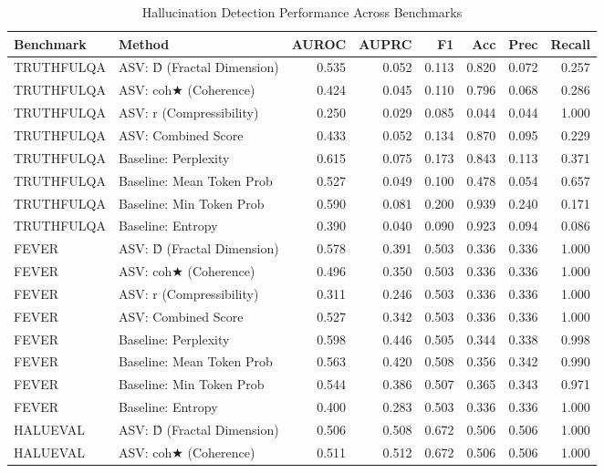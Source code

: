 \begin{table}[htbp]
\centering
\caption{Hallucination Detection Performance Across Benchmarks}
\label{tab:results}
\begin{tabular}{llrrrrrr}
\toprule
Benchmark & Method & AUROC & AUPRC & F1 & Acc & Prec & Recall \\
\midrule
TRUTHFULQA & ASV: D̂ (Fractal Dimension) & 0.535 & 0.052 & 0.113 & 0.820 & 0.072 & 0.257 \\
TRUTHFULQA & ASV: coh★ (Coherence) & 0.424 & 0.045 & 0.110 & 0.796 & 0.068 & 0.286 \\
TRUTHFULQA & ASV: r (Compressibility) & 0.250 & 0.029 & 0.085 & 0.044 & 0.044 & 1.000 \\
TRUTHFULQA & ASV: Combined Score & 0.433 & 0.052 & 0.134 & 0.870 & 0.095 & 0.229 \\
TRUTHFULQA & Baseline: Perplexity & 0.615 & 0.075 & 0.173 & 0.843 & 0.113 & 0.371 \\
TRUTHFULQA & Baseline: Mean Token Prob & 0.527 & 0.049 & 0.100 & 0.478 & 0.054 & 0.657 \\
TRUTHFULQA & Baseline: Min Token Prob & 0.590 & 0.081 & 0.200 & 0.939 & 0.240 & 0.171 \\
TRUTHFULQA & Baseline: Entropy & 0.390 & 0.040 & 0.090 & 0.923 & 0.094 & 0.086 \\
\midrule
FEVER & ASV: D̂ (Fractal Dimension) & 0.578 & 0.391 & 0.503 & 0.336 & 0.336 & 1.000 \\
FEVER & ASV: coh★ (Coherence) & 0.496 & 0.350 & 0.503 & 0.336 & 0.336 & 1.000 \\
FEVER & ASV: r (Compressibility) & 0.311 & 0.246 & 0.503 & 0.336 & 0.336 & 1.000 \\
FEVER & ASV: Combined Score & 0.527 & 0.342 & 0.503 & 0.336 & 0.336 & 1.000 \\
FEVER & Baseline: Perplexity & 0.598 & 0.446 & 0.505 & 0.344 & 0.338 & 0.998 \\
FEVER & Baseline: Mean Token Prob & 0.563 & 0.420 & 0.508 & 0.356 & 0.342 & 0.990 \\
FEVER & Baseline: Min Token Prob & 0.544 & 0.386 & 0.507 & 0.365 & 0.343 & 0.971 \\
FEVER & Baseline: Entropy & 0.400 & 0.283 & 0.503 & 0.336 & 0.336 & 1.000 \\
\midrule
HALUEVAL & ASV: D̂ (Fractal Dimension) & 0.506 & 0.508 & 0.672 & 0.506 & 0.506 & 1.000 \\
HALUEVAL & ASV: coh★ (Coherence) & 0.511 & 0.512 & 0.672 & 0.506 & 0.506 & 1.000 \\

\end{tabular}
\end{table}
